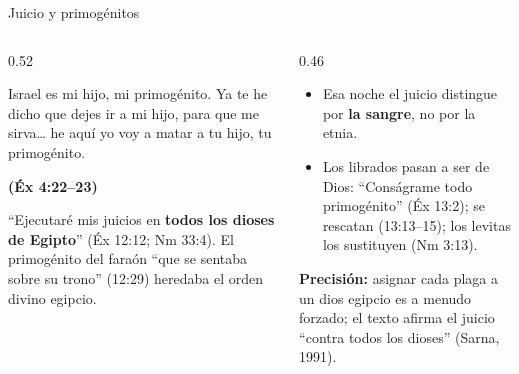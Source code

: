 \documentclass[hyperref={bookmarks=false},aspectratio=169]{beamer}
\newcommand{\fuente}[1]{\par\hfill{\upshape\bfseries\footnotesize\textcolor{tierraroja}{#1}}}
\newcommand{\destacar}[1]{\textbf{\textcolor{tierraroja}{#1}}}
\newcommand{\precision}[1]{{\footnotesize\color{sepia}\textbf{Precisión:} #1}}
\begin{document}
\begin{frame}{Juicio y primogénitos}
\begin{columns}[t,onlytextwidth]
\begin{column}{0.52\textwidth}
\begin{cita}Israel es mi hijo, mi primogénito. Ya te he dicho que dejes ir a mi hijo, para que me sirva\ldots{} he aquí yo voy a matar a tu hijo, tu primogénito.\fuente{(Éx 4:22--23)}\end{cita}
\small\RaggedRight ``Ejecutaré mis juicios en \destacar{todos los dioses de Egipto}'' (Éx 12:12; Nm 33:4). El primogénito del faraón ``que se sentaba sobre su trono'' (12:29) heredaba el orden divino egipcio.
\end{column}
\begin{column}{0.46\textwidth}\small
\begin{itemize}
\item Esa noche el juicio distingue por \destacar{la sangre}, no por la etnia.
\item Los librados pasan a ser de Dios: ``Conságrame todo primogénito'' (Éx 13:2); se rescatan (13:13--15); los levitas los sustituyen (Nm 3:13).
\end{itemize}
\precision{asignar cada plaga a un dios egipcio es a menudo forzado; el texto afirma el juicio ``contra todos los dioses'' (Sarna, 1991).}
\end{column}
\end{columns}
\end{frame}
\end{document}
